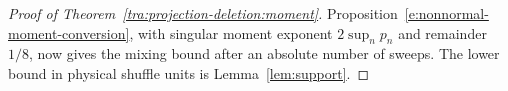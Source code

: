 \begin{proof}[Proof of Theorem~\ref{tra:projection-deletion:moment}]
Proposition~\ref{e:nonnormal-moment-conversion}, with singular
moment exponent $2\sup_n p_n$ and remainder $1/8$, now gives the
mixing bound after an absolute number of sweeps. The lower bound in
physical shuffle units is Lemma~\ref{lem:support}.

\end{proof}
